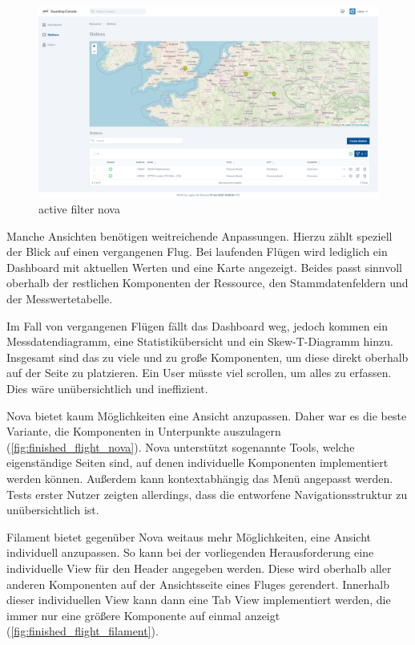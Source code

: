\begin{figure}[h!]
    \centering
    \caption{active filter nova}
    \label{fig:active_filter_nova}
    \includegraphics[scale=0.30]{assets/active_filter_nova}
\end{figure}

Manche Ansichten benötigen weitreichende Anpassungen.
Hierzu zählt speziell der Blick auf einen vergangenen Flug.
Bei laufenden Flügen wird lediglich ein Dashboard mit aktuellen Werten und eine Karte angezeigt.
Beides passt sinnvoll oberhalb der restlichen Komponenten der Ressource, den Stammdatenfeldern und der Messwertetabelle.

Im Fall von vergangenen Flügen fällt das Dashboard weg, jedoch kommen ein Messdatendiagramm, eine Statistikübersicht und ein Skew-T-Diagramm hinzu.
Insgesamt sind das zu viele und zu große Komponenten, um diese direkt oberhalb auf der Seite zu platzieren.
Ein User müsste viel scrollen, um alles zu erfassen.
Dies wäre unübersichtlich und ineffizient.

Nova bietet kaum Möglichkeiten eine Ansicht anzupassen.
Daher war es die beste Variante, die Komponenten in Unterpunkte auszulagern (\ref{fig:finished_flight_nova}).
Nova unterstützt sogenannte Tools, welche eigenständige Seiten sind, auf denen individuelle Komponenten implementiert werden können.
Außerdem kann kontextabhängig das Menü angepasst werden.
Tests erster Nutzer zeigten allerdings, dass die entworfene Navigationsstruktur zu unübersichtlich ist.

Filament bietet gegenüber Nova weitaus mehr Möglichkeiten, eine Ansicht individuell anzupassen.
So kann bei der vorliegenden Herausforderung eine individuelle View für den Header angegeben werden.
Diese wird oberhalb aller anderen Komponenten auf der Ansichtsseite eines Fluges gerendert.
Innerhalb dieser individuellen View kann dann eine Tab View implementiert werden, die immer nur eine größere Komponente auf einmal anzeigt (\ref{fig:finished_flight_filament}).

